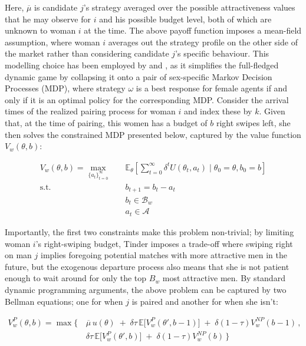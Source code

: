 Here, $\overline\mu$ is candidate $j$'s strategy averaged over the possible attractiveness values that he may observe for $i$ and his possible budget level, both of which are unknown to woman $i$ at the time. The above payoff function imposes a mean-field assumption, where woman $i$ averages out the strategy profile on the other side of the market rather than considering candidate $j$'s specific behaviour. This modelling choice has been employed by \cite{immorlica2021designing} and \cite{iyer2014mean}, as it simplifies the full-fledged dynamic game by collapsing it onto a pair of sex-specific Markov Decision Processes (MDP), where strategy $\omega$ is a best response for female agents if and only if it is an optimal policy for the corresponding MDP. Consider the arrival times of the realized pairing process for woman $i$ and index these by $k$. Given that, at the time of pairing, this women has a budget of $b$ right swipes left, she then solves the constrained MDP presented below, captured by the value function $V_w(\theta,b)$:

\begin{equation}
    \begin{aligned} 
        V_w(\theta,b)=\max_{\{a_t\}^\infty_{t=0}} \quad & \mathbb{E}_{\theta}\left[\sum^\infty_{t=0} \delta^{t} U(\theta_t, a_t) \;|\; \theta_0=\theta, b_0=b\right]\\ 
        \textrm{s.t.} \quad & b_{t+1}  = b_t -a_t \\
        & b_t\in \mathcal{B}_w \\
        & a_t\in \mathcal{A}  
    \end{aligned}
\end{equation}

Importantly, the first two constraints make this problem non-trivial; by limiting woman $i$'s right-swiping budget, Tinder imposes a trade-off where swiping right on man $j$ implies foregoing potential matches with more attractive men in the future, but the exogenous departure process also means that she is not patient enough to wait around for only the top $B_w$ most attractive men. By standard dynamic programming arguments, the above problem can be captured by two Bellman equations; one for when $j$ is paired and another for when she isn't:

\begin{equation}
    \begin{split}
    V^{P}_w(\theta,b) = \max \Big\{\, & \overline{\mu}\, u(\theta) \;+\; \delta \tau \,\mathbb{E}\Big[V^P_w(\theta', b-1)\Big] \;+\; \delta (1-\tau)V^{NP}_w(b-1)\,,\\  & \delta \tau \,\mathbb{E}\Big[ V^P_w(\theta', b)\Big] \;+\; \delta (1-\tau) V^{NP}_w(b)\, \Big\}\\  
    \end{split}
\end{equation} 

